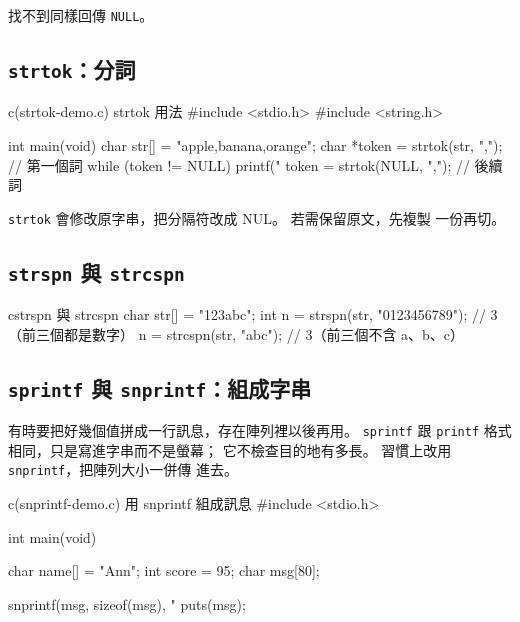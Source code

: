 
找不到同樣回傳 \texttt{NULL}。

\subsection{\texttt{strtok}：分詞}

\begin{example}{c}{(strtok-demo.c) strtok 用法}
#include <stdio.h>
#include <string.h>

int main(void) {
    char str[] = "apple,banana,orange";
    char *token = strtok(str, ",");   // 第一個詞
    while (token != NULL) {
        printf("%
        token = strtok(NULL, ",");    // 後續詞
    }
}
\end{example}


\texttt{strtok} 會修改原字串，把分隔符改成 NUL。 若需保留原文，先複製
一份再切。

\subsection{\texttt{strspn} 與 \texttt{strcspn}}

\begin{code}{c}{strspn 與 strcspn}
char str[] = "123abc";
int n = strspn(str, "0123456789");  // 3（前三個都是數字）
n = strcspn(str, "abc");            // 3（前三個不含 a、b、c）
\end{code}

\subsection{\texttt{sprintf} 與 \texttt{snprintf}：組成字串}

有時要把好幾個值拼成一行訊息，存在陣列裡以後再用。
\texttt{sprintf} 跟 \texttt{printf} 格式相同，只是寫進字串而不是螢幕；
它不檢查目的地有多長。 習慣上改用 \texttt{snprintf}，把陣列大小一併傳
進去。

\begin{example}{c}{(snprintf-demo.c) 用 snprintf 組成訊息}
#include <stdio.h>

int main(void) {
    char name[] = "Ann";
    int score = 95;
    char msg[80];

    snprintf(msg, sizeof(msg), "%
    puts(msg);
}
\end{example}

